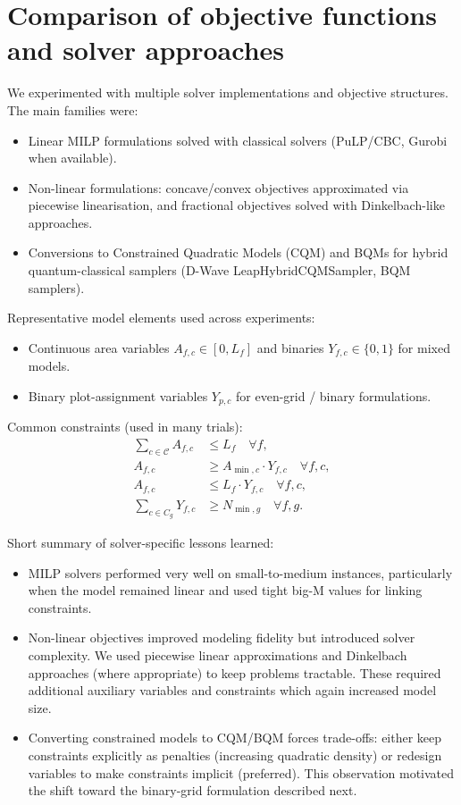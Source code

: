 \documentclass[11pt,a4paper]{article}
\begin{document}
\section{Comparison of objective functions and solver approaches}

We experimented with multiple solver implementations and objective structures. The main families were:

\begin{itemize}
    \item Linear MILP formulations solved with classical solvers (PuLP/CBC, Gurobi when available).
    \item Non-linear formulations: concave/convex objectives approximated via piecewise linearisation, and fractional objectives solved with Dinkelbach-like approaches.
    \item Conversions to Constrained Quadratic Models (CQM) and BQMs for hybrid quantum-classical samplers (D-Wave LeapHybridCQMSampler, BQM samplers).
\end{itemize}

Representative model elements used across experiments:
\begin{itemize}
    \item Continuous area variables $A_{f,c} \in [0,L_f]$ and binaries $Y_{f,c}\in\{0,1\}$ for mixed models.
    \item Binary plot-assignment variables $Y_{p,c}$ for even-grid / binary formulations.
\end{itemize}

Common constraints (used in many trials):
\begin{align}
\sum_{c \in \mathcal{C}} A_{f,c} &\le L_f \quad \forall f, \\
A_{f,c} &\ge A_{\min,c} \cdot Y_{f,c} \quad \forall f,c,\\
A_{f,c} &\le L_f \cdot Y_{f,c} \quad \forall f,c,\\
\sum_{c \in C_g} Y_{f,c} &\ge N_{\min,g} \quad \forall f,g.
\end{align}

Short summary of solver-specific lessons learned:
\begin{itemize}
    \item MILP solvers performed very well on small-to-medium instances, particularly when the model remained linear and used tight big-M values for linking constraints.
    \item Non-linear objectives improved modeling fidelity but introduced solver complexity. We used piecewise linear approximations and Dinkelbach approaches (where appropriate) to keep problems tractable. These required additional auxiliary variables and constraints which again increased model size.
    \item Converting constrained models to CQM/BQM forces trade-offs: either keep constraints explicitly as penalties (increasing quadratic density) or redesign variables to make constraints implicit (preferred). This observation motivated the shift toward the binary-grid formulation described next.
\end{itemize}
\end{document}
